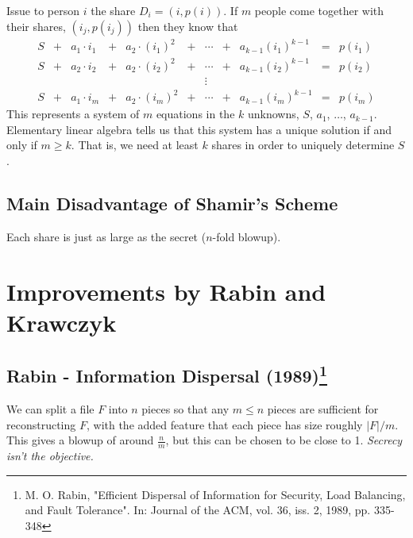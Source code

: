 \documentclass[12pt]{article}
\begin{document}
\noindent Issue to person $i$ the share $D_i = (i, p(i))$. If $m$ people come together with their shares, $(i_j, p(i_j))$ then they know that
\[
\begin{array}{ccccccccccc}
	S & + & a_1\cdot i_1 & + & a_2\cdot (i_1)^2 &+& \cdots& + & a_{k-1}(i_1)^{k-1} & = & p(i_1)\\
	S & + & a_2\cdot i_2 & + & a_2\cdot (i_2)^2 &+& \cdots& + & a_{k-1}(i_2)^{k-1} & = & p(i_2)\\
	&&&&&&\vdots&&&\\
	S & + & a_1\cdot i_m & + & a_2\cdot (i_m)^2 &+& \cdots& + & a_{k-1}(i_m)^{k-1} & = & p(i_m)
\end{array}
\]
This represents a system of $m$ equations in the $k$ unknowns, $S$, $a_1$, $\ldots$, $a_{k-1}$. Elementary linear algebra tells us that this system has a unique solution if and only if $m\geq k$. That is, we need at least $k$ shares in order to uniquely determine $S$.

\subsection*{Main Disadvantage of Shamir's Scheme}
Each share is just as large as the secret ($n$-fold blowup).

\section*{Improvements by Rabin and Krawczyk}
\subsection*{Rabin - Information Dispersal (1989)\footnote{M. O. Rabin, "Efficient Dispersal of Information for Security, Load Balancing, and Fault Tolerance". In: Journal of the ACM, vol. 36, iss. 2, 1989, pp. 335-348}}
We can split a file $F$ into $n$ pieces so that any $m\leq n$ pieces are sufficient for reconstructing $F$, with the added feature that each piece has size roughly $|F|/m$. This gives a blowup of around $\frac{n}{m}$, but this can be chosen to be close to 1. \textit{Secrecy isn't the objective.}\\
\end{document}
